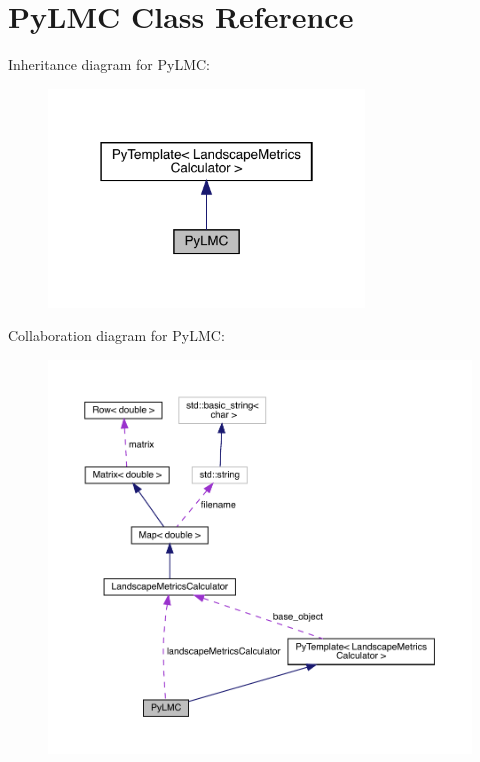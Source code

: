 \hypertarget{class_py_l_m_c}{}\section{Py\+L\+MC Class Reference}
\label{class_py_l_m_c}


Inheritance diagram for Py\+L\+MC\+:\nopagebreak
\begin{figure}[H]
\begin{center}
\leavevmode
\includegraphics[width=238pt]{class_py_l_m_c__inherit__graph}
\end{center}
\end{figure}


Collaboration diagram for Py\+L\+MC\+:\nopagebreak
\begin{figure}[H]
\begin{center}
\leavevmode
\includegraphics[width=350pt]{class_py_l_m_c__coll__graph}
\end{center}
\end{figure}

